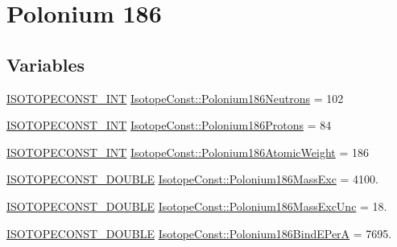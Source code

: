 \hypertarget{group___isotope_const-_polonium-_po186}{}\section{Polonium 186}
\label{group___isotope_const-_polonium-_po186}
\subsection*{Variables}
\begin{DoxyCompactItemize}
\item 
\mbox{\hyperlink{group___isotope_const-_macros_ga5f18360b3e99483a35c32d789e62621c}{I\+S\+O\+T\+O\+P\+E\+C\+O\+N\+S\+T\+\_\+\+I\+NT}} \mbox{\hyperlink{group___isotope_const-_polonium-_po186_gae7c9276374004f940f12468b48cf8baa}{Isotope\+Const\+::\+Polonium186\+Neutrons}} = 102
\item 
\mbox{\hyperlink{group___isotope_const-_macros_ga5f18360b3e99483a35c32d789e62621c}{I\+S\+O\+T\+O\+P\+E\+C\+O\+N\+S\+T\+\_\+\+I\+NT}} \mbox{\hyperlink{group___isotope_const-_polonium-_po186_ga34280317a3c65e1200108d5626d023ca}{Isotope\+Const\+::\+Polonium186\+Protons}} = 84
\item 
\mbox{\hyperlink{group___isotope_const-_macros_ga5f18360b3e99483a35c32d789e62621c}{I\+S\+O\+T\+O\+P\+E\+C\+O\+N\+S\+T\+\_\+\+I\+NT}} \mbox{\hyperlink{group___isotope_const-_polonium-_po186_gaf3d09806411f980abc433702e3959f42}{Isotope\+Const\+::\+Polonium186\+Atomic\+Weight}} = 186
\item 
\mbox{\hyperlink{group___isotope_const-_macros_ga8f45a7272ce02c0b4c65c44636ed719a}{I\+S\+O\+T\+O\+P\+E\+C\+O\+N\+S\+T\+\_\+\+D\+O\+U\+B\+LE}} \mbox{\hyperlink{group___isotope_const-_polonium-_po186_ga1b633674085603a2814ebd151571cde6}{Isotope\+Const\+::\+Polonium186\+Mass\+Exc}} = 4100.
\item 
\mbox{\hyperlink{group___isotope_const-_macros_ga8f45a7272ce02c0b4c65c44636ed719a}{I\+S\+O\+T\+O\+P\+E\+C\+O\+N\+S\+T\+\_\+\+D\+O\+U\+B\+LE}} \mbox{\hyperlink{group___isotope_const-_polonium-_po186_ga00297f0ab78b609fdad2ebc7a309b91a}{Isotope\+Const\+::\+Polonium186\+Mass\+Exc\+Unc}} = 18.
\item 
\mbox{\hyperlink{group___isotope_const-_macros_ga8f45a7272ce02c0b4c65c44636ed719a}{I\+S\+O\+T\+O\+P\+E\+C\+O\+N\+S\+T\+\_\+\+D\+O\+U\+B\+LE}} \mbox{\hyperlink{group___isotope_const-_polonium-_po186_gab79ed947b7c5b61114f0cfcb67d1da5d}{Isotope\+Const\+::\+Polonium186\+Bind\+E\+PerA}} = 7695.
\item 

\end{DoxyCompactItemize}
